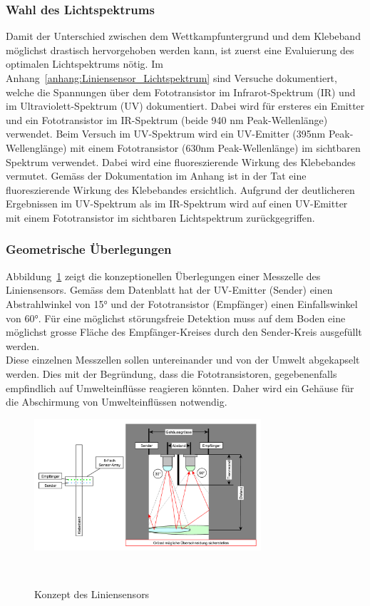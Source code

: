\documentclass[main.tex]{subfiles} %
\begin{document}
\subsubsection{Wahl des Lichtspektrums}
Damit der Unterschied zwischen dem Wettkampfuntergrund und dem Klebeband möglichst 
drastisch hervorgehoben werden kann, ist zuerst eine Evaluierung des optimalen
Lichtspektrums nötig. Im Anhang~\ref{anhang:Liniensensor_Lichtspektrum} sind Versuche dokumentiert, welche die Spannungen 
über dem Fototransistor im Infrarot-Spektrum (IR) und im Ultraviolett-Spektrum (UV) 
dokumentiert. Dabei wird für ersteres ein Emitter und ein Fototransistor im IR-Spektrum (beide 940 nm Peak-Wellenlänge)
verwendet. Beim Versuch im UV-Spektrum wird ein UV-Emitter (395nm Peak-Wellenglänge) mit einem Fototransistor (630nm Peak-Wellenlänge) 
im sichtbaren Spektrum verwendet. Dabei wird eine fluoreszierende Wirkung des Klebebandes 
vermutet. Gemäss der Dokumentation im Anhang ist in der Tat eine fluoreszierende Wirkung des Klebebandes 
ersichtlich. Aufgrund der deutlicheren Ergebnissen im UV-Spektrum als im IR-Spektrum wird auf einen 
UV-Emitter mit einem Fototransistor im sichtbaren Lichtspektrum zurückgegriffen.


\subsubsection{Geometrische Überlegungen}
Abbildung~\ref{fig:Konzept_graphml} zeigt die konzeptionellen Überlegungen einer Messzelle des
Liniensensors. Gemäss dem Datenblatt hat der UV-Emitter (Sender) einen Abstrahlwinkel von 15° und der
Fototransistor (Empfänger) einen Einfallswinkel von 60°. Für eine möglichst störungsfreie Detektion muss auf dem Boden 
eine möglichst grosse Fläche des Empfänger-Kreises durch den Sender-Kreis ausgefüllt werden.\\
Diese einzelnen Messzellen sollen untereinander und von der Umwelt abgekapselt werden. Dies
mit der Begründung, dass die Fototransistoren, gegebenenfalls empfindlich auf
Umwelteinflüsse reagieren könnten. Daher wird ein Gehäuse für die Abschirmung von Umwelteinflüssen
notwendig.

\begin{figure}[H]
    \centering
    \includegraphics[width=0.75\textwidth]{fig_Strecke_Tracken/Konzept.pdf}
    \caption{Konzept des Liniensensors}~\label{fig:Konzept_graphml}
\end{figure}
\end{document}
